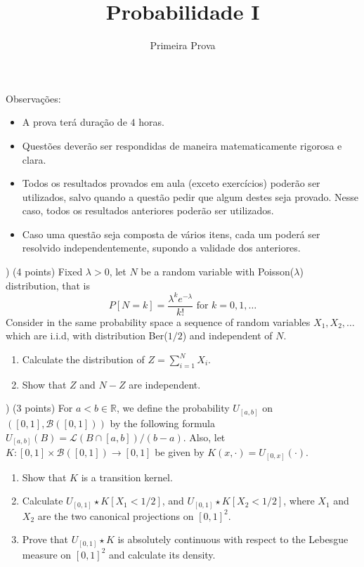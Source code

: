 \documentclass{article}
\newcommand*\1{\mathds{1}}
\begin{document}
\title{Probabilidade I}
\author{Primeira Prova}

\maketitle

\noindent Observa\c{c}\~oes:
\begin{itemize}
\item A prova terá duração de $4$ horas.
\item Questões deverão ser respondidas de maneira matematicamente rigorosa e clara.
\item Todos os resultados provados em aula (exceto exercícios) poderão ser utilizados, salvo quando a questão pedir que algum destes seja provado. Nesse caso, todos os resultados anteriores poderão ser utilizados.
\item Caso uma questão seja composta de vários itens, cada um poderá ser resolvido independentemente, supondo a validade dos anteriores.
\end{itemize}

\vspace{4mm}
) (4 points) Fixed $\lambda > 0$, let $N$ be a random variable with Poisson($\lambda$) distribution, that is
\begin{equation}
  P[N = k] = \frac{\lambda^k e^{-\lambda}}{k!} \text{ for $k = 0, 1, \dots$}
\end{equation}
Consider in the same probability space a sequence of random variables $X_1, X_2, \dots$ which are i.i.d, with distribution Ber($1/2$) and independent of $N$.
\begin{enumerate}[\quad a)]
\item Calculate the distribution of $Z = \sum_{i=1}^N X_i$.
\item Show that $Z$ and $N - Z$ are independent.
\end{enumerate}

\vspace{4mm}
) (3 points) For $a < b \in \mathbb{R}$, we define the probability $U_{[a,b]}$ on $([0,1], \mathcal{B}([0,1]))$ by the following formula $U_{[a,b]}(B) = \mathcal{L}(B \cap [a,b])/(b-a)$.
Also, let $K:[0,1] \times \mathcal{B}([0,1]) \to [0,1]$ be given by $K(x, \cdot) = U_{[0,x]} (\cdot)$.
\begin{enumerate}[\quad a)]
\item Show that $K$ is a transition kernel.
\item Calculate $U_{[0,1]} \star K [X_1 < 1/2]$, and $U_{[0,1]} \star K [X_2 < 1/2]$, where $X_1$ and $X_2$ are the two canonical projections on $[0,1]^2$.
\item Prove that $U_{[0,1]} \star K$ is absolutely continuous with respect to the Lebesgue measure on $[0,1]^2$ and calculate its density.
\end{enumerate}
\end{document}
